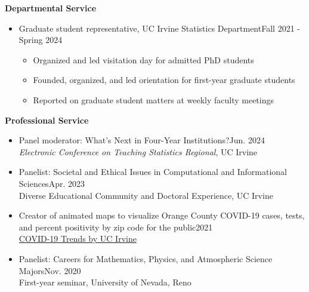 \documentclass{article}
\begin{document}
	
	\newpage
	\begin{description}
		\vspace{-2mm}
		\item[Service and Outreach]\hspace*{.1in} 
		
		\textbf{Departmental Service}
		\begin{itemize}
			\item Graduate student representative, UC Irvine Statistics Department\hfill{Fall 2021 - Spring 2024}
			\begin{itemize}
				\item Organized and led visitation day for admitted PhD students
				\vspace*{-1mm}
				\item Founded, organized, and led orientation for first-year graduate students
				\vspace*{-1mm}
				\item Reported on graduate student matters at weekly faculty meetings
			\end{itemize}
		\end{itemize}
		
		\textbf{Professional Service}
		\begin{itemize}
			\item Panel moderator: What's Next in Four-Year Institutions?\hfill{Jun. 2024}\\
			\textit{Electronic Conference on Teaching Statistics Regional}, UC Irvine 
			
			\item Panelist: Societal and Ethical Issues in Computational and Informational Sciences\hfill{Apr. 2023}\\ 
			Diverse Educational Community and Doctoral Experience, UC Irvine
			
			\item Creator of animated maps to visualize Orange County COVID-19 cases, tests, and percent positivity by zip code for the public\hfill{2021}\\
			\href{https://www.stat.uci.edu/covid19/index.html}{COVID-19 Trends by UC Irvine}
			
			\item Panelist: Careers for Mathematics, Physics, and Atmospheric Science Majors\hfill{Nov. 2020}\\
			First-year seminar, University of Nevada, Reno
			

\end{itemize}
\end{description}
\end{document}
